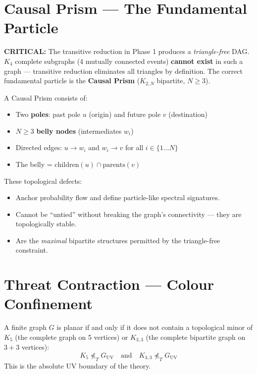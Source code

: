 \documentclass[11pt, a4paper, openany]{book}
\begin{document}
\section{Causal Prism --- The Fundamental Particle}

\textbf{CRITICAL:} The transitive reduction in Phase 1 produces a
\emph{triangle-free} DAG.  $K_4$ complete subgraphs (4 mutually connected
events) \textbf{cannot exist} in such a graph --- transitive reduction
eliminates all triangles by definition.  The correct fundamental
particle is the \textbf{Causal Prism} ($K_{2,N}$ bipartite, $N \ge 3$).

A Causal Prism consists of:
\begin{itemize}
  \item Two \textbf{poles}: past pole $u$ (origin) and future pole $v$ (destination)
  \item $N \ge 3$ \textbf{belly nodes} (intermediates $w_i$)
  \item Directed edges: $u \to w_i$ and $w_i \to v$ for all $i \in \{1 \dots N\}$
  \item The belly = $\text{children}(u) \cap \text{parents}(v)$
\end{itemize}

These topological defects:
\begin{itemize}
  \item Anchor probability flow and define particle-like spectral signatures.
  \item Cannot be ``untied'' without breaking the graph's connectivity ---
        they are topologically stable.
  \item Are the \emph{maximal} bipartite structures permitted by the
        triangle-free constraint.
\end{itemize}

\section{Threat Contraction --- Colour Confinement}

\begin{theorem}
A finite graph $G$ is planar if and only if it does not contain a topological
minor of $K_5$ (the complete graph on 5 vertices) or $K_{3,3}$ (the complete
bipartite graph on $3+3$ vertices):
\[
  K_5 \not\preceq_T G_{\text{UV}} \quad \text{and} \quad
  K_{3,3} \not\preceq_T G_{\text{UV}}
\]
This is the absolute UV boundary of the theory.
\end{theorem}
\end{document}
